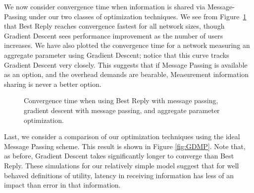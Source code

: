 \documentclass[11pt]{IEEEtran}
\theoremstyle{definition}
\begin{document}
We now consider convergence time when information is shared via Message-Passing under our two  classes of optimization techniques. We see from Figure~\ref{fig:convergence2} that Best Reply reaches convergence fastest for all network sizes, though Gradient Descent sees performance improvement as the number of users increases.  We have also plotted the convergence time for a network measuring an aggregate parameter using Gradient Descent; notice that this curve tracks Gradient Descent very closely. This suggests that if Message Passing is available as an option, and the overhead demands are bearable, Measurement information sharing is never a better option. 


\begin{figure}[htp]
\begin{center}
  
  
  \caption{Convergence time when using Best Reply with message passing, gradient
  descent with message passing, and aggregate parameter optimization.}
  \label{fig:convergence2}
\end{center}
\end{figure}

Last, we consider a comparison of our optimization techniques using the ideal Message Passing scheme.  This result is shown in Figure \ref{fig:GDMP}.  Note that, as before, Gradient Descent takes significantly longer to converge than Best Reply. These simulations for our relatively simple model suggest that for well behaved definitions of utility, latency in receiving information has less of an impact than error in that information.
\end{document}
